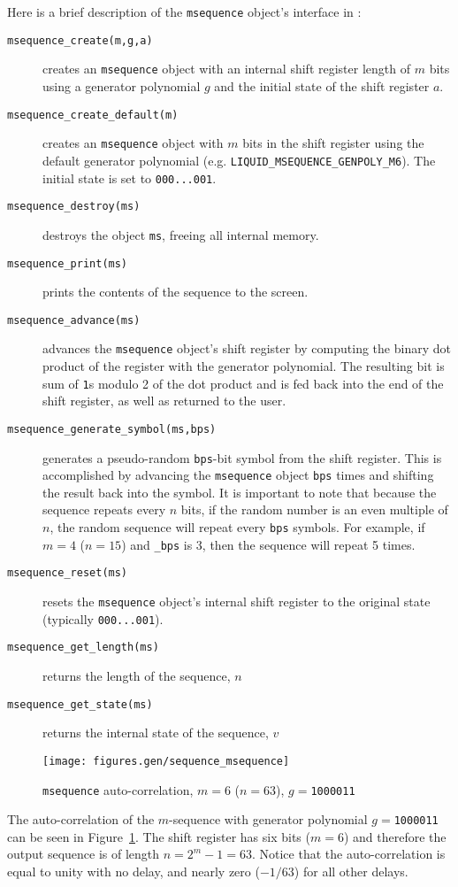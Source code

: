 Here is a brief description of the {\tt msequence} object's interface in
\liquid:
%
\begin{description}
\item[{\tt msequence\_create(m,g,a)}]
    creates an {\tt msequence} object with an internal shift register
    length of $m$ bits using a generator polynomial $g$ and the initial
    state of the shift register $a$.
\item[{\tt msequence\_create\_default(m)}]
    creates an {\tt msequence} object with $m$ bits in the shift
    register using the default generator polynomial
    (e.g. {\tt LIQUID\_MSEQUENCE\_GENPOLY\_M6}).
    The initial state is set to {\tt 000...001}.
\item[{\tt msequence\_destroy(ms)}]
    destroys the object {\tt ms}, freeing all internal memory.
\item[{\tt msequence\_print(ms)}]
    prints the contents of the sequence to the screen.
\item[{\tt msequence\_advance(ms)}]
    advances the {\tt msequence} object's shift register by computing the
    binary dot product of the register with the generator polynomial.
    The resulting bit is sum of {\tt 1}s modulo 2 of the dot product and is
    fed back into the end of the shift register, as well as returned to the
    user.
\item[{\tt msequence\_generate\_symbol(ms,bps)}]
    generates a pseudo-random {\tt bps}-bit symbol from the shift register.
    This is accomplished by advancing the {\tt msequence} object {\tt bps}
    times and shifting the result back into the symbol.
    It is important to note that because the sequence repeats every $n$ bits,
    if the random number is an even multiple of $n$, the random sequence will
    repeat every {\tt bps} symbols.
    For example, if $m=4$ ($n=15$) and {\tt \_bps} is 3, then the sequence
    will repeat 5 times.
\item[{\tt msequence\_reset(ms)}]
    resets the {\tt msequence} object's internal shift register to the
    original state (typically {\tt 000...001}).
\item[{\tt msequence\_get\_length(ms)}]
    returns the length of the sequence, $n$
\item[{\tt msequence\_get\_state(ms)}]
    returns the internal state of the sequence, $v$
\end{description}
%
\begin{figure}
\centering
  \texttt{[image: figures.gen/sequence\_msequence]}
\caption{{\tt msequence} auto-correlation, $m=6$ ($n=63$), $g=${\tt 1000011}}
\label{fig:module:sequence:msequence}
\end{figure}
%
%
%
The auto-correlation of the $m$-sequence with generator polynomial
$g=${\tt 1000011}
can be seen in Figure~\ref{fig:module:sequence:msequence}.
The shift register has six bits ($m=6$) and therefore the output sequence is
of length $n=2^m-1=63$.
Notice that the auto-correlation is equal to unity with no delay, and nearly
zero ($-1/63$) for all other delays.



